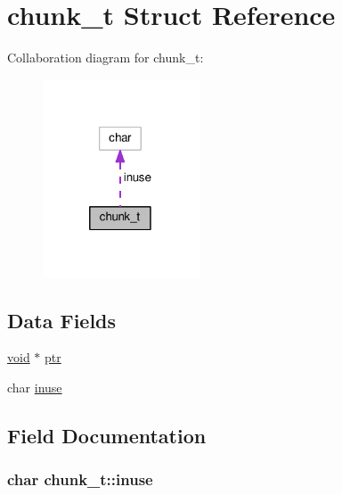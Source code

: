 \hypertarget{structchunk__t}{}\section{chunk\+\_\+t Struct Reference}
\label{structchunk__t}


Collaboration diagram for chunk\+\_\+t\+:
\nopagebreak
\begin{figure}[H]
\begin{center}
\leavevmode
\includegraphics[width=133pt]{structchunk__t__coll__graph}
\end{center}
\end{figure}
\subsection*{Data Fields}
\begin{DoxyCompactItemize}
\item 
\hyperlink{group__MOD__ISAPI_gacd6cdbf73df3d9eed42fa493d9b621a6}{void} $\ast$ \hyperlink{structchunk__t_a3a78ab4ca5fd5ca731a282d3b1a8e7d3}{ptr}
\item 
char \hyperlink{structchunk__t_a13b954da8f418a2050e328adba9fb3c7}{inuse}
\end{DoxyCompactItemize}


\subsection{Field Documentation}
\subsubsection[{\texorpdfstring{inuse}{inuse}}]{\setlength{\rightskip}{0pt plus 5cm}char chunk\+\_\+t\+::inuse}\hypertarget{structchunk__t_a13b954da8f418a2050e328adba9fb3c7}{}\label{structchunk__t_a13b954da8f418a2050e328adba9fb3c7}
